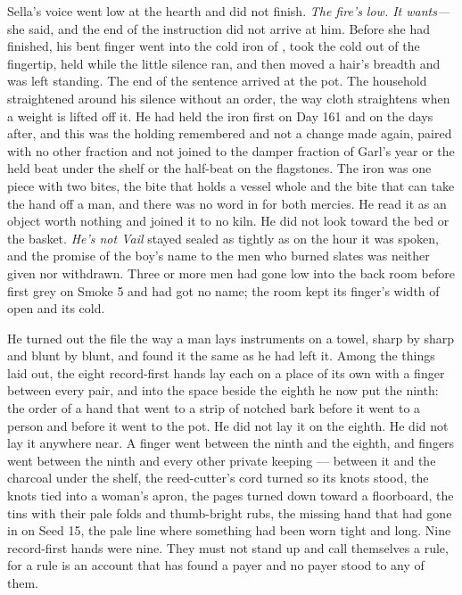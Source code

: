 Sella's voice went low at the hearth and did not finish. \emph{The fire's low. It wants---} she said, and the end of the instruction did not arrive at him. Before she had finished, his bent finger went into the cold iron of , took the cold out of the fingertip, held while the little silence ran, and then moved a hair's breadth and was left standing. The end of the sentence arrived at the pot. The household straightened around his silence without an order, the way cloth straightens when a weight is lifted off it. He had held the iron first on Day 161 and on the days after, and this was the holding remembered and not a change made again, paired with no other fraction and not joined to the damper fraction of Garl's year or the held beat under the shelf or the half-beat on the flagstones. The iron was one piece with two bites, the bite that holds a vessel whole and the bite that can take the hand off a man, and there was no word in  for both mercies. He read it as an object worth nothing and joined it to no kiln. He did not look toward the bed or the basket. \emph{He's not Vail} stayed sealed as tightly as on the hour it was spoken, and the promise of the boy's name to the men who burned slates was neither given nor withdrawn. Three or more men had gone low into the back room before first grey on Smoke 5 and had got no name; the room kept its finger's width of open and its cold.

He turned out the file the way a man lays instruments on a towel, sharp by sharp and blunt by blunt, and found it the same as he had left it. Among the things laid out, the eight record-first hands lay each on a place of its own with a finger between every pair, and into the space beside the eighth he now put the ninth: the order of a hand that went to a strip of notched bark before it went to a person and before it went to the pot. He did not lay it on the eighth. He did not lay it anywhere near. A finger went between the ninth and the eighth, and fingers went between the ninth and every other private keeping --- between it and the charcoal under the shelf, the reed-cutter's cord turned so its knots stood, the knots tied into a woman's apron, the pages turned down toward a floorboard, the tins with their pale folds and thumb-bright rubs, the missing hand that had gone in on Seed 15, the pale line where something had been worn tight and long. Nine record-first hands were nine. They must not stand up and call themselves a rule, for a rule is an account that has found a payer and no payer stood to any of them.

